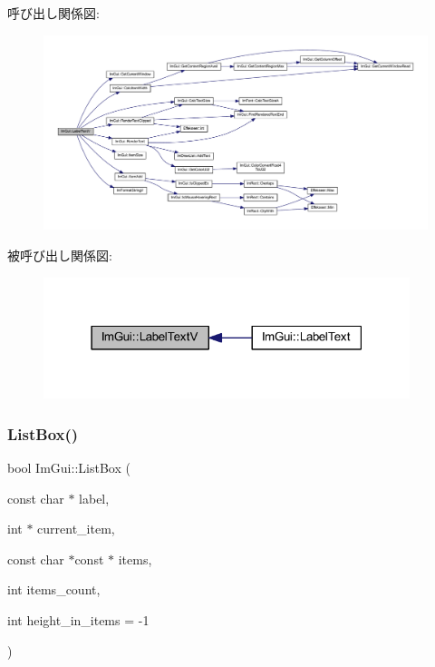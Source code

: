 呼び出し関係図\+:\nopagebreak
\begin{figure}[H]
\begin{center}
\leavevmode
\includegraphics[width=350pt]{namespace_im_gui_a55e5a7edb676a8f5cd7f65443138a8a0_cgraph}
\end{center}
\end{figure}
被呼び出し関係図\+:\nopagebreak
\begin{figure}[H]
\begin{center}
\leavevmode
\includegraphics[width=303pt]{namespace_im_gui_a55e5a7edb676a8f5cd7f65443138a8a0_icgraph}
\end{center}
\end{figure}
\mbox{\label{namespace_im_gui_a93d68a6602e155134405ce17085501e9}} 
\subsubsection{\texorpdfstring{List\+Box()}{ListBox()}\hspace{0.1cm}{\footnotesize\ttfamily [1/2]}}
{\footnotesize\ttfamily bool Im\+Gui\+::\+List\+Box (\begin{DoxyParamCaption}\item[{const char $\ast$}]{label,  }\item[{int $\ast$}]{current\+\_\+item,  }\item[{const char $\ast$const $\ast$}]{items,  }\item[{int}]{items\+\_\+count,  }\item[{int}]{height\+\_\+in\+\_\+items = {\ttfamily -\/1} }\end{DoxyParamCaption})}



